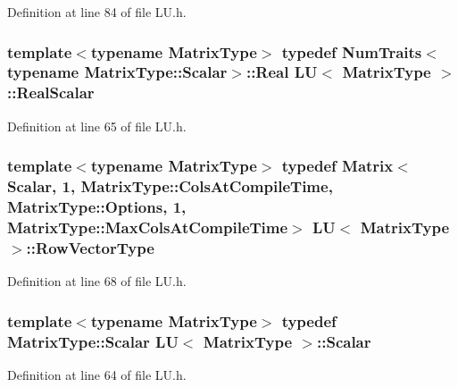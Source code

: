Definition at line 84 of file L\-U.\-h.

\hypertarget{class_l_u_a2b211092ffd28cd189ea254c951cf8d5}{
\subsubsection[{Real\-Scalar}]{\setlength{\rightskip}{0pt plus 5cm}template$<$typename Matrix\-Type$>$ typedef {\bf Num\-Traits}$<$typename Matrix\-Type\-::\-Scalar$>$\-::Real {\bf L\-U}$<$ Matrix\-Type $>$\-::{\bf Real\-Scalar}}}\label{class_l_u_a2b211092ffd28cd189ea254c951cf8d5}


Definition at line 65 of file L\-U.\-h.

\hypertarget{class_l_u_acc26e46398241948a442c0435c282fd1}{
\subsubsection[{Row\-Vector\-Type}]{\setlength{\rightskip}{0pt plus 5cm}template$<$typename Matrix\-Type$>$ typedef {\bf Matrix}$<${\bf Scalar}, 1, Matrix\-Type\-::\-Cols\-At\-Compile\-Time, Matrix\-Type\-::\-Options, 1, Matrix\-Type\-::\-Max\-Cols\-At\-Compile\-Time$>$ {\bf L\-U}$<$ Matrix\-Type $>$\-::{\bf Row\-Vector\-Type}}}\label{class_l_u_acc26e46398241948a442c0435c282fd1}


Definition at line 68 of file L\-U.\-h.

\hypertarget{class_l_u_a2652e625ba82c85391e6cf4c3d821350}{
\subsubsection[{Scalar}]{\setlength{\rightskip}{0pt plus 5cm}template$<$typename Matrix\-Type$>$ typedef Matrix\-Type\-::\-Scalar {\bf L\-U}$<$ Matrix\-Type $>$\-::{\bf Scalar}}}\label{class_l_u_a2652e625ba82c85391e6cf4c3d821350}


Definition at line 64 of file L\-U.\-h.



